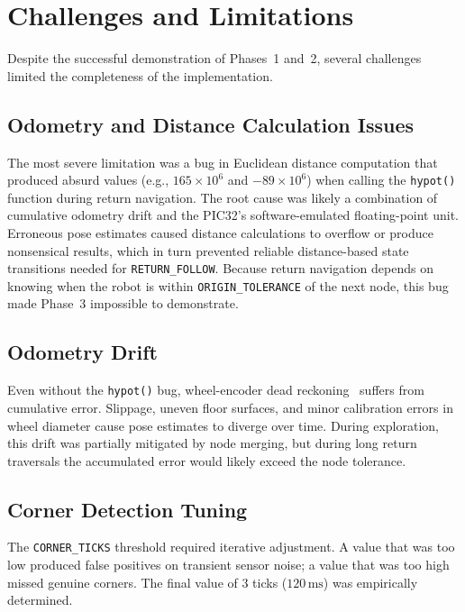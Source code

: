 \documentclass[runningheads]{llncs}
\begin{document}
\section{Challenges and Limitations}\label{sec:challenges}

Despite the successful demonstration of Phases~1 and~2, several challenges limited the completeness of the implementation.

\subsection{Odometry and Distance Calculation Issues}

The most severe limitation was a bug in Euclidean distance computation that produced absurd values (e.g., $165\times10^6$ and $-89\times10^6$) when calling the \texttt{hypot()} function during return navigation. The root cause was likely a combination of cumulative odometry drift and the PIC32's software-emulated floating-point unit. Erroneous pose estimates caused distance calculations to overflow or produce nonsensical results, which in turn prevented reliable distance-based state transitions needed for \texttt{RETURN\_FOLLOW}. Because return navigation depends on knowing when the robot is within \texttt{ORIGIN\_TOLERANCE} of the next node, this bug made Phase~3 impossible to demonstrate.

\subsection{Odometry Drift}

Even without the \texttt{hypot()} bug, wheel-encoder dead reckoning~\cite{borenstein1996} suffers from cumulative error. Slippage, uneven floor surfaces, and minor calibration errors in wheel diameter cause pose estimates to diverge over time. During exploration, this drift was partially mitigated by node merging, but during long return traversals the accumulated error would likely exceed the node tolerance.

\subsection{Corner Detection Tuning}

The \texttt{CORNER\_TICKS} threshold required iterative adjustment. A value that was too low produced false positives on transient sensor noise; a value that was too high missed genuine corners. The final value of 3 ticks ($120\,\text{ms}$) was empirically determined.
\end{document}
